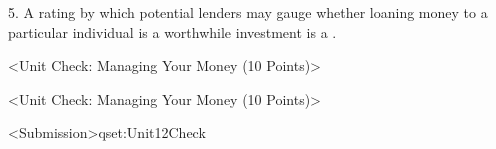 \begin{naquestionfillintheblankwordbank}[individual=true]
	\label{qid.Unit12Check.5} 
	\begin{naqwordbank}[unique=true]
	\end{naqwordbank}

	\begin{naqfillintheblankwithwordbankpart}	
		\begin{naqinput}
			5. A rating by which potential lenders may gauge whether loaning money to a particular individual is a worthwhile investment is a .\\
		\end{naqinput}
		\begin{naqpaireditems}
		\end{naqpaireditems}
	\end{naqfillintheblankwithwordbankpart}
\end{naquestionfillintheblankwordbank}

\begin{naquestionset}<Unit Check: Managing Your Money (10 Points)>
	\label{qset:Unit12Check}
\end{naquestionset}

\begin{naassignment}[not_before_date=2014-01-28,not_after_date=2014-12-12,public=true]<Unit Check: Managing Your Money (10 Points)>
    \label{assignment:Unit12Check}
    \begin{naassignmentpart}[auto_grade=true]<Submission>{qset:Unit12Check}
    \end{naassignmentpart}
\end{naassignment}

